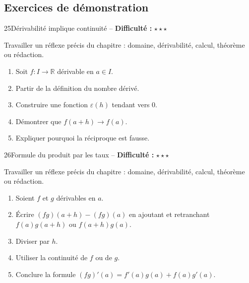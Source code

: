 \documentclass[11pt,a4paper]{article}
\newcommand{\R}{\mathbb{R}}
\newcommand{\etoiles}[1]{\textbf{Difficulté :} #1}
\begin{document}
\subsection{Exercices de démonstration}

\begin{exobox}{25}{Dérivabilité implique continuité -- \etoiles{$\star\star\star$}}

\begin{objectifbox}
Travailler un réflexe précis du chapitre : domaine, dérivabilité, calcul, théorème ou rédaction.
\end{objectifbox}

\begin{enumerate}

\item Soit $f:I\to\R$ dérivable en $a\in I$.

\item Partir de la définition du nombre dérivé.

\item Construire une fonction $\varepsilon(h)$ tendant vers $0$.

\item Démontrer que $f(a+h)\to f(a)$.

\item Expliquer pourquoi la réciproque est fausse.

\end{enumerate}

\end{exobox}


\begin{exobox}{26}{Formule du produit par les taux -- \etoiles{$\star\star\star$}}

\begin{objectifbox}
Travailler un réflexe précis du chapitre : domaine, dérivabilité, calcul, théorème ou rédaction.
\end{objectifbox}

\begin{enumerate}

\item Soient $f$ et $g$ dérivables en $a$.

\item Écrire $(fg)(a+h)-(fg)(a)$ en ajoutant et retranchant $f(a)g(a+h)$ ou $f(a+h)g(a)$.

\item Diviser par $h$.

\item Utiliser la continuité de $f$ ou de $g$.

\item Conclure la formule $(fg)'(a)=f'(a)g(a)+f(a)g'(a)$.

\end{enumerate}

\end{exobox}
\end{document}
